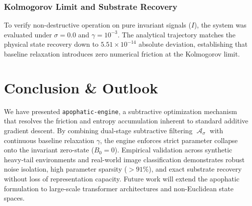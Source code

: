\documentclass[11pt,a4paper]{article}
\DeclareMathOperator{\Apophatic}{\mathcal{A}}
\newcommand{\Baseline}{B_0}
\begin{document}
\subsubsection{Kolmogorov Limit and Substrate Recovery}
To verify non-destructive operation on pure invariant signals ($I$), the system was evaluated under $\sigma=0.0$ and $\gamma=10^{-3}$. The analytical trajectory matches the physical state recovery down to $5.51 \times 10^{-14}$ absolute deviation, establishing that baseline relaxation introduces zero numerical friction at the Kolmogorov limit.

\section{Conclusion \& Outlook}
We have presented \texttt{apophatic-engine}, a subtractive optimization mechanism that resolves the friction and entropy accumulation inherent to standard additive gradient descent. By combining dual-stage subtractive filtering $\Apophatic_\sigma$ with continuous baseline relaxation $\gamma$, the engine enforces strict parameter collapse onto the invariant zero-state ($\Baseline = 0$). Empirical validation across synthetic heavy-tail environments and real-world image classification demonstrates robust noise isolation, high parameter sparsity ($>91\%$), and exact substrate recovery without loss of representation capacity. Future work will extend the apophatic formulation to large-scale transformer architectures and non-Euclidean state spaces.



\end{document}
